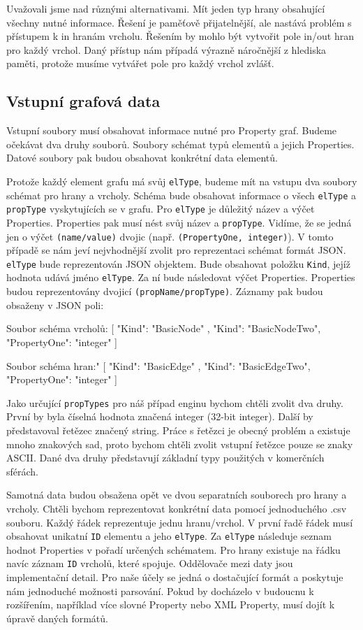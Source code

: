 Uvažovali jsme nad různými alternativami. 
Mít jeden typ hrany obsahující všechny nutné informace.
Řešení je paměťově přijatelnější, ale nastává problém s přístupem k in hranám vrcholu.
Řešením by mohlo být vytvořit pole in/out hran pro každý vrchol. 
Daný přístup nám případá výrazně náročnější z hlediska paměti, protože musíme vytvářet pole pro každý vrchol zvlášť. 

\subsection{Vstupní grafová data}

Vstupní soubory musí obsahovat informace nutné pro Property graf.
Budeme očekávat dva druhy souborů.
Soubory schémat typů elementů a jejich Properties.
Datové soubory pak budou obsahovat konkrétní data elementů.

Protože každý element grafu má svůj \verb+elType+, budeme mít na vstupu dva soubory schémat pro hrany a vrcholy.
Schéma bude obsahovat informace o všech \verb+elType+ a \verb+propType+ vyskytujících se v grafu.
Pro \verb+elType+ je důležitý název a výčet Properties.
Properties pak musí nést svůj název a \verb+propType+.
Vidíme, že se jedná jen o výčet \verb+(name/value)+ dvojic (např. \verb+(PropertyOne, integer)+).
V tomto případě se nám jeví nejvhodnější zvolit pro reprezentaci schémat formát JSON.
\verb+elType+ bude reprezentován JSON objektem. 
Bude obsahovat položku \verb+Kind+, jejíž hodnota udává jméno \verb+elType+.
Za ní bude následovat výčet Properties.
Properties budou reprezentovány dvojicí \verb+(propName/propType)+.
Záznamy pak budou obsaženy v JSON poli:
\begin{code}
Soubor schéma vrcholů:
[    { "Kind": "BasicNode" }, 
     { "Kind": "BasicNodeTwo", "PropertyOne": "integer" } ]

Soubor schéma hran:"
[    { "Kind": "BasicEdge" }, 
     { "Kind": "BasicEdgeTwo", "PropertyOne": "integer" } ]
\end{code}
Jako určující \verb+propTypes+ pro náš případ enginu bychom chtěli zvolit dva druhy.
První by byla číselná hodnota značená integer (32-bit integer).
Další by představoval řetězec značený string.
Práce s řetězci je obecný problém a existuje mnoho znakových sad, proto bychom chtěli zvolit vstupní řetězce pouze se znaky ASCII.  
Dané dva druhy představují základní typy použitých v komerčních sférách.

Samotná data budou obsažena opět ve dvou separatních souborech pro hrany a vrcholy.
Chtěli bychom reprezentovat konkrétní data pomocí jednoduchého .csv souboru.
Každý řádek reprezentuje jednu hranu/vrchol.
V první řadě řádek musí obsahovat unikatní \verb+ID+ elementu a jeho \verb+elType+. 
Za \verb+elType+ následuje seznam hodnot Properties v pořadí určených schématem.
Pro hrany existuje na řádku navíc záznam \verb+ID+ vrcholů, které spojuje.
Oddělovače mezi daty jsou implementační detail.
Pro naše účely se jedná o dostačující formát a poskytuje nám jednoduché možnosti parsování.
Pokud by docházelo v budoucnu k rozšířením, například více slovné Property nebo XML Property, musí dojít k úpravě daných formátů.

